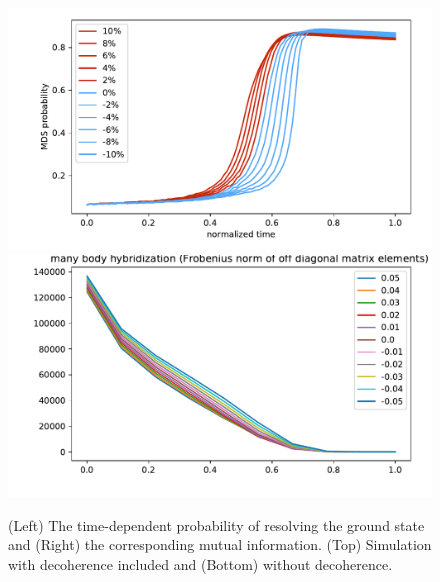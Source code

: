 \documentclass[prd,twocolumn,tightenlines,preprintnumbers,showpacs,superscriptaddress,notitlepage,nofootinbib,eqsecnum,floatfix,longbibliography]{revtex4}
\begin{document}
\begin{figure}
	\centering
	\includegraphics[width=\columnwidth]{./figures/full_prob_deco.pdf}
	\includegraphics[width=\columnwidth]{./figures/hybridization.pdf}
	\caption{(Left) The time-dependent probability of resolving the ground state and (Right) the corresponding mutual information. (Top) Simulation with decoherence included and (Bottom) without decoherence.}
	\label{fig:prob_mi}
\end{figure}
\end{document}
